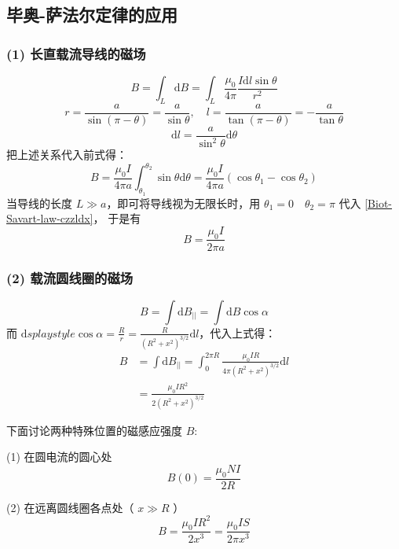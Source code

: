 \subsection{毕奥-萨法尔定律的应用}
\subsubsection{(1) 长直载流导线的磁场}
$$
  B=\int_{L}\mathrm{d} B=\int_{L}\frac{\mu_0}{4\pi}\frac{I\mathrm{d} l\sin\theta}{r^2}
$$
$$
r=\frac{a}{\sin(\pi-\theta)}=\frac{a}{\sin\theta},\quad l=\frac{a}{\tan(\pi-\theta)}=-\frac{a}{\tan\theta}
$$
$$
\mathrm{d} l=\frac{a}{\sin^2\theta}\mathrm{d} \theta
$$
把上述关系代入前式得：
\begin{equation}
  \label{Biot-Savart-law-czzldx}
  B=\frac{\mu_0I}{4\pi a}\int_{\theta_1}^{\theta_2}\sin\theta\mathrm{d} \theta
  =\frac{\mu_0I}{4\pi a}(\cos \theta_1-\cos \theta_2)
\end{equation}
当导线的长度 $L \gg a$，即可将导线视为无限长时，用 $\theta_1=0\quad\theta_2=\pi$ 代入 \autoref{Biot-Savart-law-czzldx}，
于是有
\begin{equation}
  \label{Biot-Savart-law-czzldx-infty}
  B=\frac{\mu_0I}{2\pi a}
\end{equation}

\subsubsection{(2) 载流圆线圈的磁场}
$$
B=\int \mathrm{d} B_{||}=\int \mathrm{d} B \cos \alpha
$$
而 $\mathrm{d}splaystyle \cos \alpha =\frac{R}{r}=\frac{R}{(R^2+x^2)^{3/2}}\mathrm{d} l$，代入上式得：
\begin{equation}
  \label{Biot-Savart-law-zlyxq}
  \begin{aligned}
  B &= \int \mathrm{d} B_{||}=\int^{2\pi R}_{0}\frac{\mu_0IR}{4\pi(R^2+x^{2})^{3/2}}\mathrm{d} l \\
  &=\frac{\mu_0IR^2}{2(R^{2}+x^{2})^{3/2}}
  \end{aligned}
\end{equation}

下面讨论两种特殊位置的磁感应强度 $B$:

(1) 在圆电流的圆心处
\begin{equation}
  \label{Biot-Savart-law-zlyxq-heart}
  B(0)=\frac{\mu_0 NI}{2R}
\end{equation}

(2) 在远离圆线圈各点处（ $x\gg R$ ）
\begin{equation}
  \label{Biot-Savart-law-zlyxq-infty}
  B=\frac{\mu_0IR^{2}}{2x^{3}}=\frac{\mu_0IS}{2\pi x^{3}}
\end{equation}
  
